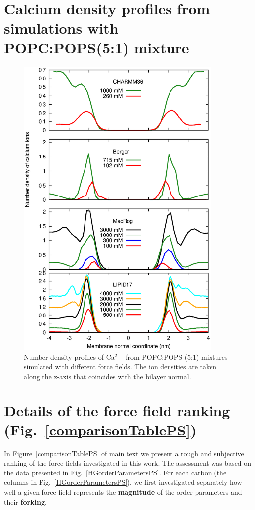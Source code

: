 \documentclass[journal=jpcbfk,manuscript=article]{achemso}
\newcommand{\todo}[1]{\textcolor{red}{#1}}
\begin{document}
\section{Calcium density profiles from simulations with \\ POPC:POPS(5:1) mixture}
\begin{figure}[ht]
  \centering
  \includegraphics[width=10cm]{../Figs/CAdensPCPSmixture.eps}
  \caption{\label{CAdensPCPSmixtureALL}
    Number density profiles of Ca$^{2+}$ from POPC:POPS (5:1) mixtures simulated with different force fields. The ion densities are taken along the z-axis that coincides with the bilayer normal. 
  }
\end{figure}

\clearpage

\section{Details of the force field ranking (Fig.~\ref{comparisonTablePS})}\label{Ranking} 
In Figure~\ref{comparisonTablePS} of main text we present a rough and subjective ranking of the force fields investigated in this work. 
The assessment was based on the data presented in Fig.~\ref{HGorderParametersPS}.
%
For each carbon (the columns in Fig.~\ref{HGorderParametersPS}),
we first investigated separately how well a given force field represents the {\bf magnitude} of the order parameters and their {\bf forking}.
\end{document}
